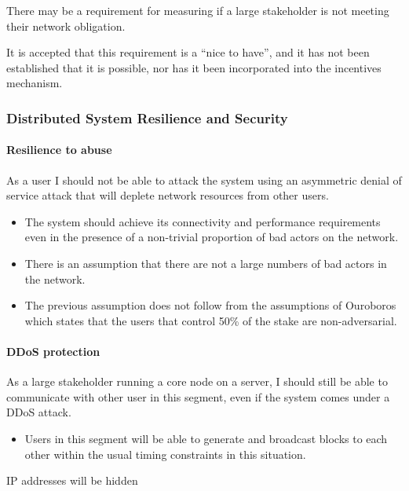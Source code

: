 \documentclass{report}
\theoremstyle{definition}{
  \newtheorem{lemma}{Lemma}[section] %
  \newtheorem{definition}[lemma]{Definition}
}
\theoremstyle{theorem}{
  \newtheorem{invariant}[lemma]{Invariant}
  \newtheorem{proofobligation}[lemma]{Proof Obligation}
}
\numberwithin{equation}{lemma}
\begin{document}
There may be a requirement for measuring if a large stakeholder is not meeting
their network obligation.

It is accepted that this requirement is a ``nice to have'', and it has not been
established that it is possible, nor has it been incorporated into the
incentives mechanism.

\subsubsection{Distributed System Resilience and Security}

\paragraph{Resilience to abuse}

As a user I should not be able to attack the system using an asymmetric denial
of service attack that will deplete network resources from other users.

\begin{itemize}
\item The system should achieve its connectivity and performance requirements
      even in the presence of a non-trivial proportion of bad actors on the
      network.
\item There is an assumption that there are not a large numbers of bad actors
      in the network.
\item The previous assumption does not follow from the assumptions of Ouroboros
      which states that the users that control 50\% of the stake are
      non-adversarial.
\end{itemize}


\paragraph{DDoS protection}

As a large stakeholder running a core node on a server, I should still be able
to communicate with other user in this segment, even if the system comes under
a DDoS attack.

\begin{itemize}
\item Users in this segment will be able to generate and broadcast blocks to
      each other within the usual timing constraints in this situation.
\end{itemize}

IP addresses will be hidden
\end{document}
